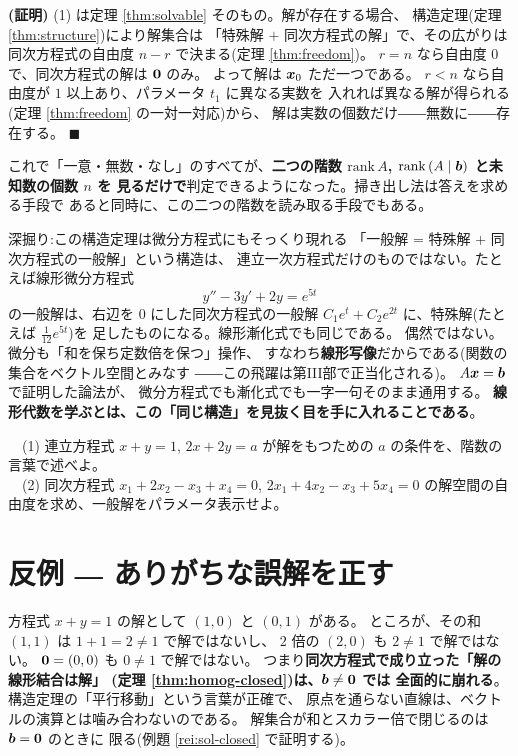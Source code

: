\noindent\textbf{(証明)}\quad
(1) は定理 \ref{thm:solvable} そのもの。解が存在する場合、
構造定理(定理 \ref{thm:structure})により解集合は
「特殊解 $+$ 同次方程式の解」で、その広がりは同次方程式の自由度
$n - r$ で決まる(定理 \ref{thm:freedom})。
$r = n$ なら自由度 $0$ で、同次方程式の解は $\bm{0}$ のみ。
よって解は $\bm{x}_0$ ただ一つである。
$r < n$ なら自由度が $1$ 以上あり、パラメータ $t_1$ に異なる実数を
入れれば異なる解が得られる(定理 \ref{thm:freedom} の一対一対応)から、
解は実数の個数だけ――無数に――存在する。 $\blacksquare$

これで「一意・無数・なし」のすべてが、\textbf{二つの階数
$\mathrm{rank}\,A$, $\mathrm{rank}\,(A \mid \bm{b})$ と未知数の個数 $n$ を
見るだけで}判定できるようになった。掃き出し法は答えを求める手段で
あると同時に、この二つの階数を読み取る手段でもある。

\begin{itembox}[l]{深掘り:この構造定理は微分方程式にもそっくり現れる}
「一般解 = 特殊解 + 同次方程式の一般解」という構造は、
連立一次方程式だけのものではない。たとえば線形微分方程式
\[
y'' - 3y' + 2y = e^{5t}
\]
の一般解は、右辺を $0$ にした同次方程式の一般解
$C_1 e^{t} + C_2 e^{2t}$ に、特殊解(たとえば $\frac{1}{12}e^{5t}$)を
足したものになる。線形漸化式でも同じである。
偶然ではない。微分も「和を保ち定数倍を保つ」操作、
すなわち\textbf{線形写像}だからである(関数の集合をベクトル空間とみなす
――この飛躍は第III部で正当化される)。
$A\bm{x} = \bm{b}$ で証明した論法が、
微分方程式でも漸化式でも一字一句そのまま通用する。
\textbf{線形代数を学ぶとは、この「同じ構造」を見抜く目を手に入れることである}。
\end{itembox}

\begin{mondai}\label{q:struct}
　(1) 連立方程式 $x + y = 1$, $2x + 2y = a$ が解をもつための
$a$ の条件を、階数の言葉で述べよ。\\
　(2) 同次方程式
$x_1 + 2x_2 - x_3 + x_4 = 0$,
$2x_1 + 4x_2 - x_3 + 5x_4 = 0$
の解空間の自由度を求め、一般解をパラメータ表示せよ。
\end{mondai}

\section{反例 ― ありがちな誤解を正す}

\begin{hanrei}\label{hanrei:nonhomog-sum}
方程式 $x + y = 1$ の解として $(1, 0)$ と $(0, 1)$ がある。
ところが、その和 $(1, 1)$ は $1 + 1 = 2 \neq 1$ で解ではないし、
$2$ 倍の $(2, 0)$ も $2 \neq 1$ で解ではない。
$\bm{0} = (0, 0)$ も $0 \neq 1$ で解ではない。
つまり\textbf{同次方程式で成り立った「解の線形結合は解」
(定理 \ref{thm:homog-closed})は、$\bm{b} \neq \bm{0}$ では
全面的に崩れる}。構造定理の「平行移動」という言葉が正確で、
原点を通らない直線は、ベクトルの演算とは噛み合わないのである。
解集合が和とスカラー倍で閉じるのは $\bm{b} = \bm{0}$ のときに
限る(例題 \ref{rei:sol-closed} で証明する)。
\end{hanrei}


